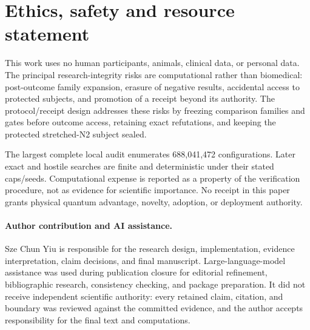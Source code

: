\section{Ethics, safety and resource statement}

This work uses no human participants, animals, clinical data, or personal data. The principal research-integrity risks are computational rather than biomedical: post-outcome family expansion, erasure of negative results, accidental access to protected subjects, and promotion of a receipt beyond its authority. The protocol/receipt design addresses these risks by freezing comparison families and gates before outcome access, retaining exact refutations, and keeping the protected stretched-N2 subject sealed.

The largest complete local audit enumerates 688,041,472 configurations. Later exact and hostile searches are finite and deterministic under their stated caps/seeds. Computational expense is reported as a property of the verification procedure, not as evidence for scientific importance. No receipt in this paper grants physical quantum advantage, novelty, adoption, or deployment authority.

\paragraph{Author contribution and AI assistance.}
Sze Chun Yiu is responsible for the research design, implementation, evidence interpretation, claim decisions, and final manuscript. Large-language-model assistance was used during publication closure for editorial refinement, bibliographic research, consistency checking, and package preparation. It did not receive independent scientific authority: every retained claim, citation, and boundary was reviewed against the committed evidence, and the author accepts responsibility for the final text and computations.